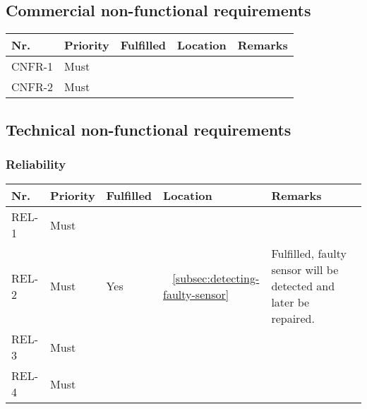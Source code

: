	\subsection{Commercial non-functional requirements}
	\begin{table}[H]
	\begin{tabular}{lllll}
	
	Nr.    & Priority & Fulfilled & Location & Remarks \\ \hline
	
	CNFR-1 & Must     & ~        & ~         & ~       \\ 
	
	CNFR-2 & Must     & ~        & ~         & ~       \\
	
	\end{tabular}
	\end{table}
	\subsection{Technical non-functional requirements}
	\subsubsection{Reliability}
	\begin{table}[H]
	\begin{tabular}{lllll}
	
	Nr.   & Priority & Fulfilled & Location & Remarks \\ \hline
	
	REL-1 & Must     & ~        & ~         & ~       \\ 
	
	REL-2 & Must     & Yes      & ~    \ref{subsec:detecting-faulty-sensor}     & Fulfilled, faulty sensor will be detected and later be repaired.       \\ 
	
	REL-3 & Must     & ~        & ~         & ~       \\ 
	
	REL-4 & Must     & ~        & ~         & ~       \\
	
	\end{tabular}
	\end{table}
	
